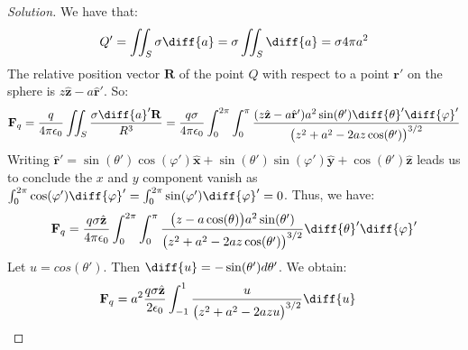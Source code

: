 \documentclass[crop=false,class=book,oneside]{standalone}
\begin{document}
            \begin{proof}[Solution]
                We have that:
                \begin{equation*}
                    Q'=\iint_{S}\sigma\diff{a}
                    =\sigma\iint_{S}\diff{a}
                    =\sigma{4}\pi{a^{2}}
                \end{equation*}
                The relative position vector $\mathbf{R}$ of the point
                $Q$ with respect to a point $\mathbf{r}'$ on the sphere
                is $z\hat{\mathbf{z}}-a\hat{\mathbf{r}}'$. So:
                \begin{equation*}
                    \mathbf{F}_{q}
                    =\frac{q}{4\pi\epsilon_{0}}\iint_{S}
                    \frac{\sigma\diff{a}'\mathbf{R}}{R^{3}}
                    =\frac{q\sigma}{4\pi\epsilon_{0}}
                    \int_{0}^{2\pi}\int_{0}^{\pi}
                    \frac{(z\hat{\mathbf{z}}-a\hat{\mathbf{r}}')a^{2}
                          \sin(\theta')\diff{\theta}'\diff{\varphi}'}
                         {\big(z^2+a^2-2az\cos(\theta')\big)^{3/2}}
                \end{equation*}
                Writing
                $\hat{\mathbf{r}}'%
                 =\sin(\theta')\cos(\varphi')\hat{\mathbf{x}}%
                 +\sin(\theta')\sin(\varphi')\hat{\mathbf{y}}%
                 +\cos(\theta')\hat{\mathbf{z}}$
                leads us to conclude the $x$ and $y$ component vanish as
                $\int_{0}^{2\pi}\cos(\varphi')\diff{\varphi}'%
                 =\int_{0}^{2\pi}\sin(\varphi')\diff{\varphi}'%
                 =0$.
                Thus, we have:
                \begin{equation*}
                    \mathbf{F}_{q}
                    =\frac{q\sigma\hat{\mathbf{z}}}{4\pi\epsilon_{0}}
                    \int_{0}^{2\pi}\int_{0}^{\pi}
                    \frac{\big(z-a\cos(\theta)\big)a^{2}
                          \sin(\theta')}
                         {\big(z^{2}+a^{2}-2az\cos(\theta')\big)^{3/2}}
                    \diff{\theta}'\diff{\varphi}'
                \end{equation*}
                Let $u=cos(\theta')$.
                Then $\diff{u}=-\sin(\theta')d\theta'$. We obtain:
                \begin{align*}
                    \mathbf{F}_{q}
                    &=a^{2}\frac{q\sigma \hat{\mathbf{z}}}{2\epsilon_{0}}
                    \int_{-1}^{1}\frac{u}{\big(z^{2}+a^{2}-2azu\big)^{3/2}}\diff{u}
                    &

\end{align*}
\end{proof}
\end{document}
